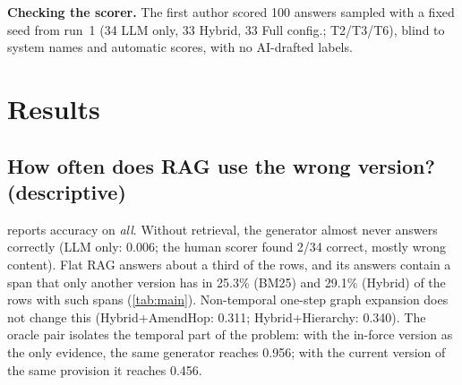 \documentclass[sigconf,anonymous,review]{acmart}
\newcommand{\sys}[1]{\textsf{#1}}
\begin{document}
\textbf{Checking the scorer.} The first author scored 100 answers sampled with a fixed seed from run~1 (34 \sys{LLM only}, 33 \sys{Hybrid}, 33 Full config.; T2/T3/T6), blind to system names and automatic scores, with no AI-drafted labels.

\section{Results}
\label{sec:results}

\subsection{How often does RAG use the wrong version? (descriptive)}

 reports accuracy on \textit{all}. Without retrieval, the generator almost never answers correctly (\sys{LLM only}: 0.006; the human scorer found 2/34 correct, mostly wrong content). Flat RAG answers about a third of the rows, and its answers contain a span that only another version has in 25.3\% (\sys{BM25}) and 29.1\% (\sys{Hybrid}) of the rows with such spans (\cref{tab:main}). Non-temporal one-step graph expansion does not change this (\sys{Hybrid+\allowbreak AmendHop}: 0.311; \sys{Hybrid+\allowbreak Hierarchy}: 0.340). The oracle pair isolates the temporal part of the problem: with the in-force version as the only evidence, the same generator reaches 0.956; with the current version of the same provision it reaches 0.456.
\end{document}
